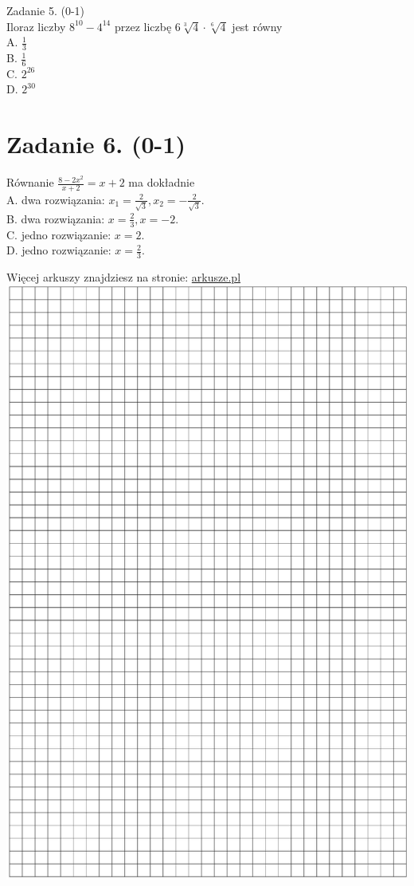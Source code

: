 \documentclass[10pt]{article}
\begin{document}
Zadanie 5. (0-1)\\
Iloraz liczby \(8^{10}-4^{14}\) przez liczbę \(6 \sqrt[3]{4} \cdot \sqrt[6]{4}\) jest równy\\
A. \(\frac{1}{3}\)\\
B. \(\frac{1}{6}\)\\
C. \(2^{26}\)\\
D. \(2^{30}\)

\section*{Zadanie 6. (0-1)}
Równanie \(\frac{8-2 x^{2}}{x+2}=x+2\) ma dokładnie\\
A. dwa rozwiązania: \(x_{1}=\frac{2}{\sqrt{3}}, x_{2}=-\frac{2}{\sqrt{3}}\).\\
B. dwa rozwiązania: \(x=\frac{2}{3}, x=-2\).\\
C. jedno rozwiązanie: \(x=2\).\\
D. jedno rozwiązanie: \(x=\frac{2}{3}\).

Więcej arkuszy znajdziesz na stronie: \href{http://arkusze.pl}{arkusze.pl}\\
\includegraphics[max width=\textwidth, center]{2024_11_21_72158d4a4efa7dd894bcg-03}
\end{document}

